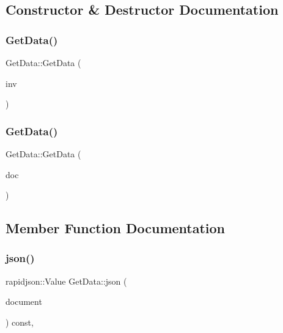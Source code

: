 \subsection{Constructor \& Destructor Documentation}
\mbox{\label{classGetData_adb9c8dc0c3f1e40329530b26bd96f32f}} 
\subsubsection{\texorpdfstring{Get\+Data()}{GetData()}\hspace{0.1cm}{\footnotesize\ttfamily [1/2]}}
{\footnotesize\ttfamily Get\+Data\+::\+Get\+Data (\begin{DoxyParamCaption}\item[{\mbox{\hyperlink{structInvData}{Inv\+Data}}}]{inv }\end{DoxyParamCaption})\hspace{0.3cm}{\ttfamily [explicit]}}

\mbox{\label{classGetData_ab1179102b6e97c85834410f0699140f6}} 
\subsubsection{\texorpdfstring{Get\+Data()}{GetData()}\hspace{0.1cm}{\footnotesize\ttfamily [2/2]}}
{\footnotesize\ttfamily Get\+Data\+::\+Get\+Data (\begin{DoxyParamCaption}\item[{rapidjson\+::\+Document $\ast$}]{doc }\end{DoxyParamCaption})\hspace{0.3cm}{\ttfamily [explicit]}}



\subsection{Member Function Documentation}
\mbox{\label{classGetData_a2fb121264fc1c5821e769f4f2389c6ff}} 
\subsubsection{\texorpdfstring{json()}{json()}}
{\footnotesize\ttfamily rapidjson\+::\+Value Get\+Data\+::json (\begin{DoxyParamCaption}\item[{rapidjson\+::\+Document $\ast$}]{document }\end{DoxyParamCaption}) const\hspace{0.3cm}{\ttfamily [override]}, {\ttfamily [virtual]}}



